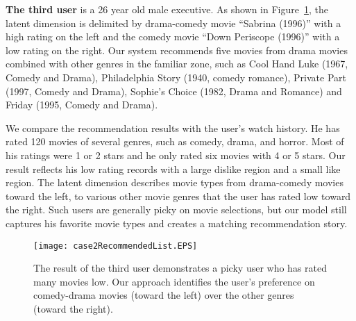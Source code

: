 \documentclass{vgtc}                          %
\begin{document}
\textbf{The third user} is a 26 year old male executive.
As shown in Figure~\ref{case2RecommendedList}, the latent dimension is delimited by drama-comedy movie ``Sabrina (1996)'' with a high rating on the left and the comedy movie ``Down Periscope (1996)'' with a low rating on the right. 
Our system recommends five movies from drama movies combined with other genres in the familiar zone, such as Cool Hand Luke (1967, Comedy and Drama), Philadelphia Story (1940, comedy romance), Private Part (1997, Comedy and Drama), Sophie’s Choice (1982, Drama and Romance) and Friday (1995, Comedy and Drama).

We compare the recommendation results with the user's watch history.
He has rated 120 movies of several genres, such as comedy, drama, and horror.
Most of his ratings were 1 or 2 stars and he only rated six movies with 4 or 5 stars.
Our result reflects his low rating records with a large dislike region and a small like region.
The latent dimension describes movie types from drama-comedy movies toward the left, to various other movie genres that the user has rated low toward the right.
Such users are generally picky on movie selections, but our model still captures his favorite movie types and creates a matching recommendation story.


\begin{figure}[htb]
\centering
\texttt{[image: case2RecommendedList.EPS]}
\caption{The result of the third user demonstrates a picky user who has rated many movies low.
Our approach identifies the user's preference on comedy-drama movies (toward the left) over the other genres (toward the right).
}
\label{case2RecommendedList}
\end{figure}
\end{document}
